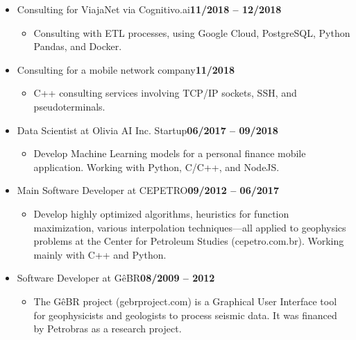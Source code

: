 \documentclass[10pt]{article}
\newenvironment{outerlist}[1][\enskip\textbullet]%
        {\begin{itemize}[#1,leftmargin=*]}{\end{itemize}%
         \vspace{-.6\baselineskip}}
\newenvironment{innerlist}[1][\enskip\textbullet]%
        {\begin{itemize}[#1,leftmargin=*,parsep=0pt,itemsep=0pt,topsep=0pt,partopsep=0pt]}
        {\end{itemize}}
\begin{document}
\begin{outerlist}

\item[] Consulting for ViajaNet via Cognitivo.ai\hfill {\bf 11/2018 -- 12/2018}
  \begin{innerlist}
  \item Consulting with ETL processes, using Google Cloud, PostgreSQL, Python
    Pandas, and Docker.
  \end{innerlist}

\item[] Consulting for a mobile network company\hfill {\bf 11/2018}
  \begin{innerlist}
  \item C++ consulting services involving TCP/IP sockets, SSH, and
    pseudoterminals.
  \end{innerlist}

\item[] Data Scientist at Olivia AI Inc. Startup\hfill {\bf 06/2017 -- 09/2018}
  \begin{innerlist}
  \item Develop Machine Learning models for a personal finance mobile
    application. Working with Python, C/C++, and NodeJS.
  \end{innerlist}

\item[] Main Software Developer at CEPETRO\hfill {\bf 09/2012 -- 06/2017}
  \begin{innerlist}
  \item Develop highly optimized algorithms, heuristics for function
maximization, various interpolation techniques---all applied to geophysics
problems at the Center for Petroleum Studies (cepetro.com.br). Working mainly
with C++ and Python.
  
  \end{innerlist}


\item[] Software Developer at GêBR\hfill {\bf 08/2009 -- 2012}
  \begin{innerlist}
  \item The GêBR project (gebrproject.com) is a Graphical User
  Interface tool for geophysicists and geologists to process seismic data. It
  was financed by Petrobras as a research project.
  \end{innerlist}


\end{outerlist}
\end{document}
